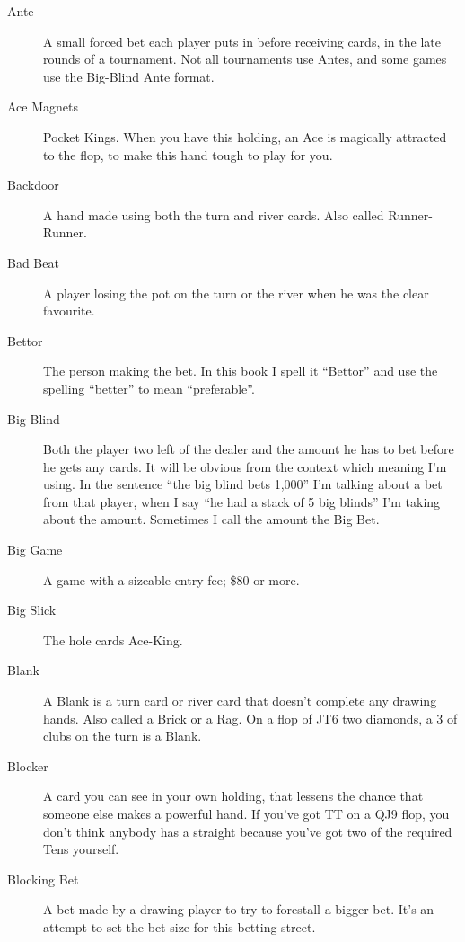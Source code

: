 \begin{description}

\item[Ante] A small forced bet each player puts in before receiving
cards, in the late rounds of a tournament. Not all tournaments use
Antes, and some games use the Big-Blind Ante format.

\item[Ace Magnets] Pocket Kings. When you have this holding, an Ace is
magically attracted to the flop, to make this hand tough to play for
you.

\item[Backdoor] A hand made using both the turn and river cards. Also
called Runner-Runner.

\item[Bad Beat] A player losing the pot on the turn or the river when
he was the clear favourite.

\item[Bettor] The person making the bet. In this book I spell it ``Bettor''
and use the spelling ``better'' to mean ``preferable''.

\item[Big Blind] Both the player two left of the dealer and the amount
he has to bet before he gets any cards. It will be obvious from the
context which meaning I'm using. In the sentence ``the big blind bets
1,000'' I'm talking about a bet from that player, when I say ``he had
a stack of 5 big blinds'' I'm taking about the amount. Sometimes I
call the amount the Big Bet.

\item[Big Game] A game with a sizeable entry fee; \$80 or more.

\item[Big Slick] The hole cards Ace-King.

\item[Blank] A Blank is a turn card or river card that doesn't
complete any drawing hands. Also called a Brick or a Rag. On a flop of
JT6 two diamonds, a 3 of clubs on the turn is a Blank.

\item[Blocker] A card you can see in your own holding, that lessens
the chance that someone else makes a powerful hand. If you've got TT
on a QJ9 flop, you don't think anybody has a straight because you've
got two of the required Tens yourself.

\item[Blocking Bet] A bet made by a drawing player to try to forestall
a  bigger bet. It's an attempt to set the bet size for this betting
street.


\end{description}
